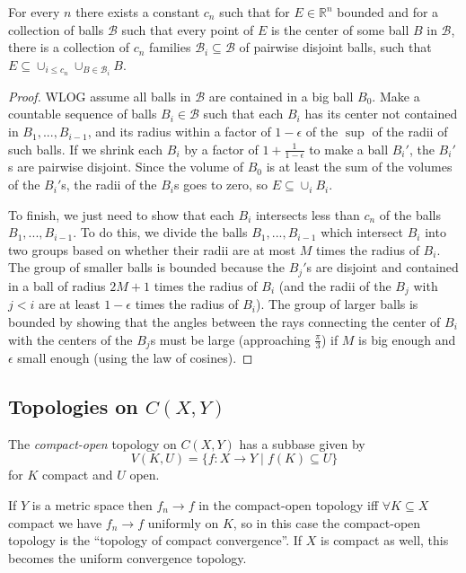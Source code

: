 \begin{lem}\label{besicovitch} For every $n$ there exists a constant $c_n$ such that for $E \in \mathbb{R}^n$ bounded and for a collection of balls $\mathcal{B}$ such that every point of $E$ is the center of some ball $B$ in $\mathcal{B}$, there is a collection of $c_n$ families $\mathcal{B}_i \subseteq \mathcal{B}$ of pairwise disjoint balls, such that $E \subseteq \cup_{i \le c_n} \cup_{B \in \mathcal{B}_i} B$.
\end{lem}
\begin{proof} WLOG assume all balls in $\mathcal{B}$ are contained in a big ball $B_0$. Make a countable sequence of balls $B_i \in \mathcal{B}$ such that each $B_i$ has its center not contained in $B_1, ..., B_{i-1}$, and its radius within a factor of $1-\epsilon$ of the $\sup$ of the radii of such balls. If we shrink each $B_i$ by a factor of $1+\frac{1}{1-\epsilon}$ to make a ball $B_i'$, the $B_i'$s are pairwise disjoint. Since the volume of $B_0$ is at least the sum of the volumes of the $B_i'$s, the radii of the $B_i$s goes to zero, so $E \subseteq \cup_i B_i$.

To finish, we just need to show that each $B_i$ intersects less than $c_n$ of the balls $B_1, ..., B_{i-1}$. To do this, we divide the balls $B_1, ..., B_{i-1}$ which intersect $B_i$ into two groups based on whether their radii are at most $M$ times the radius of $B_i$. The group of smaller balls is bounded because the $B_j'$s are disjoint and contained in a ball of radius $2M+1$ times the radius of $B_i$ (and the radii of the $B_j$ with $j < i$ are at least $1-\epsilon$ times the radius of $B_i$). The group of larger balls is bounded by showing that the angles between the rays connecting the center of $B_i$ with the centers of the $B_j$s must be large (approaching $\frac{\pi}{3}$) if $M$ is big enough and $\epsilon$ small enough (using the law of cosines).
\end{proof}


\subsection{Topologies on $C(X,Y)$}

\begin{defn} The \emph{compact-open} topology on $C(X,Y)$ has a subbase given by
\[
V(K,U) = \{f:X\rightarrow Y \mid f(K) \subseteq U\}
\]
for $K$ compact and $U$ open.
\end{defn}

\begin{prop} If $Y$ is a metric space then $f_n \rightarrow f$ in the compact-open topology iff $\forall K \subseteq X$ compact we have $f_n \rightarrow f$ uniformly on $K$, so in this case the compact-open topology is the ``topology of compact convergence''. If $X$ is compact as well, this becomes the uniform convergence topology.
\end{prop}

